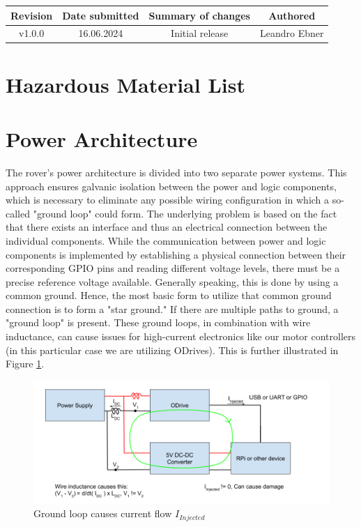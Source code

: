     \begin{table}[b]
        \centering
        \begin{tabular}{|c|c|c|c|} \hline 
             Revision&  Date submitted& Summary of changes  &Authored\\ \hline 
             v1.0.0&  16.06.2024& Initial release  &Leandro Ebner\\ \hline
        \end{tabular}
    \end{table}
    \clearpage

\section{Hazardous Material List}


\newpage

\newpage
\section{Power Architecture}

The rover's power architecture is divided into two separate power systems. This approach ensures galvanic isolation between the power and logic components, which is necessary to eliminate any possible wiring configuration in which a so-called "ground loop" could form. The underlying problem is based on the fact that there exists an interface and thus an electrical connection between the individual components. While the communication between power and logic components is implemented by establishing a physical connection between their corresponding GPIO pins and reading different voltage levels, there must be a precise reference voltage available. Generally speaking, this is done by using a common ground. Hence, the most basic form to utilize that common ground connection is to form a "star ground." If there are multiple paths to ground, a "ground loop" is present. These ground loops, in combination with wire inductance, can cause issues for high-current electronics like our motor controllers (in this particular case we are utilizing ODrives). This is further illustrated in Figure \ref{ground_loop_bad}.

\begin{figure}[h]
\includegraphics[width=\textwidth]{contents/figures/ground_loop_bad.png}
\caption{Ground loop causes current flow $I_{Injected}$}
\label{ground_loop_bad}
\end{figure}

